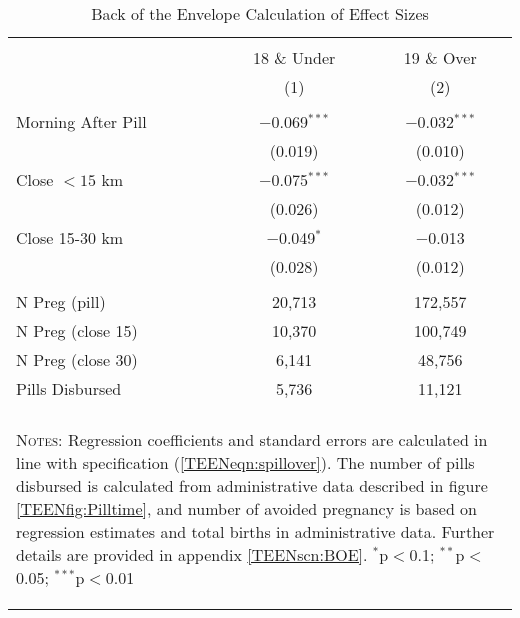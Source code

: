 \begin{table}[!htbp] \centering
\caption{Back of the Envelope Calculation of Effect Sizes}
\label{TEENtab:BOE}
\begin{tabular}{@{\extracolsep{5pt}}lcc}
\\[-1.8ex]\hline \hline \\[-1.8ex] 
& 18 \& Under & 19 \& Over\\ 
&(1)&(2) \\ \hline
 & &  \\
Morning After Pill &$-$0.069$^{***}$&$-$0.032$^{***}$\\
&(0.019)&(0.010)\\
Close $<15$ km &$-$0.075$^{***}$&$-$0.032$^{***}$\\
&(0.026)&(0.012)\\
Close 15-30 km &$-$0.049$^{*}$&$-$0.013\\
&(0.028)&(0.012)\\
& & \\ \midrule
N Preg (pill) &20,713&172,557\\
N Preg (close 15) &10,370&100,749\\
N Preg (close 30) &6,141&48,756\\
Pills Disbursed & 5,736 & 11,121 \\
\hline \hline \\[-1.8ex]
\multicolumn{3}{p{7.2cm}}{\begin{footnotesize}\textsc{Notes:} 
Regression coefficients and standard errors are calculated in 
line with specification (\ref{TEENeqn:spillover}). The number of 
pills disbursed is calculated from administrative data described in 
figure \ref{TEENfig:Pilltime}, and number of avoided pregnancy is 
based on regression estimates and total births in administrative 
data. Further details are provided in appendix \ref{TEENscn:BOE}.
$^{*}$p$<$0.1; $^{**}$p$<$0.05; $^{***}$p$<$0.01\end{footnotesize}}
\normalsize\end{tabular}\end{table}
